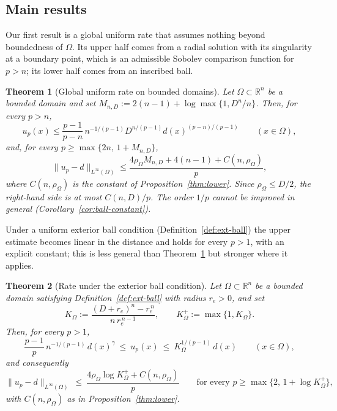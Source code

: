 \documentclass[11pt]{article}
\newcommand{\R}{\mathbb R}
\newcommand{\norm}[1]{\lVert #1\rVert}
\newtheorem{theorem}{Theorem}[section]
\theoremstyle{definition}
\theoremstyle{remark}
\begin{document}
\subsection*{Main results}
Our first result is a global uniform rate that assumes nothing beyond
boundedness of $\Omega$. Its upper half comes from a radial solution with its
singularity at a boundary point, which is an admissible Sobolev comparison
function for $p>n$; its lower half comes from an inscribed ball.
\begin{theorem}[Global uniform rate on bounded domains]\label{thm:universal-rate}
Let $\Omega\subset\R^n$ be a bounded domain and set
$M_{n,D}:=2(n-1)+\log\max\{1,D^n/n\}$. Then, for every $p>n$,
\begin{equation}\label{eq:universal-upper}
u_p(x)\le
\frac{p-1}{p-n}\,n^{-1/(p-1)}D^{n/(p-1)}
d(x)^{(p-n)/(p-1)}
\qquad(x\in\Omega),
\end{equation}
and, for every $p\ge\max\{2n,\,1+M_{n,D}\}$,
\begin{equation}\label{eq:universal-rate}
\norm{u_p-d}_{L^\infty(\Omega)}
\le\frac{4\rho_\Omega M_{n,D}+4(n-1)+C(n,\rho_\Omega)}{p},
\end{equation}
where $C(n,\rho_\Omega)$ is the constant of Proposition~\ref{thm:lower}. Since
$\rho_\Omega\le D/2$, the right-hand side is at most $C(n,D)/p$. The order
$1/p$ cannot be improved in general (Corollary~\ref{cor:ball-constant}).
\end{theorem}

Under a uniform exterior ball condition (Definition~\ref{def:ext-ball}) the
upper estimate becomes linear in the distance and holds for every $p>1$, with
an explicit constant; this is less general than
Theorem~\ref{thm:universal-rate} but stronger where it applies.
\begin{theorem}[Rate under the exterior ball condition]\label{thm:main}
Let $\Omega\subset\R^n$ be a bounded domain satisfying
Definition~\ref{def:ext-ball} with radius $r_e>0$, and set
\begin{equation}\label{eq:Komega}
K_\Omega:=\frac{(D+r_e)^n-r_e^{\,n}}{n\,r_e^{\,n-1}},
\qquad
K_\Omega^+:=\max\{1,K_\Omega\}.
\end{equation}
Then, for every $p>1$,
\begin{equation}\label{eq:main-pointwise}
\frac{p-1}{p}\,n^{-1/(p-1)}\,d(x)^{\gamma}
\ \le\ u_p(x)\ \le\ K_\Omega^{1/(p-1)}\,d(x)
\qquad(x\in\Omega),
\end{equation}
and consequently
\begin{equation}\label{eq:main-rate}
\norm{u_p-d}_{L^\infty(\Omega)}
\ \le\ \frac{4\rho_\Omega\log K_\Omega^+ + C(n,\rho_\Omega)}{p}
\qquad\text{for every }p\ge\max\{2,\,1+\log K_\Omega^+\},
\end{equation}
with $C(n,\rho_\Omega)$ as in Proposition~\ref{thm:lower}.
\end{theorem}
\end{document}
